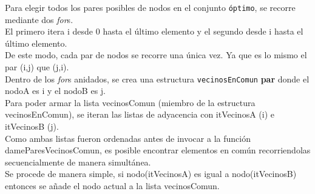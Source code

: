 \begin{algorithm}[h!]
\end{algorithm}

Para elegir todos los pares posibles de nodos en el conjunto \texttt{\'optimo}, se recorre mediante dos \emph{for}s.\\
El primero itera i desde 0 hasta el \'ultimo elemento y el segundo desde i hasta el \'ultimo elemento.\\
De este modo, cada par de nodos se recorre una \'unica vez. Ya que es lo mismo el par (i,j) que (j,i).\\

Dentro de los \emph{for}s anidados, se crea una estructura \texttt{vecinosEnComun} \textbf{par} donde el nodoA es i y el nodoB es j.\\

Para poder armar la lista vecinosComun (miembro de la estructura vecinosEnComun), se iteran las listas de adyacencia con itVecinosA (i) e itVecinosB (j).\\

Como ambas listas fueron ordenadas antes de invocar a la funci\'on dameParesVecinosComun, es posible encontrar elementos en com\'un recorriendolas secuencialmente de manera simult\'anea.\\

Se procede de manera simple, si nodo(itVecinosA) es igual a nodo(itVecinosB) entonces se a\~nade el nodo actual a la lista vecinosComun.\\

